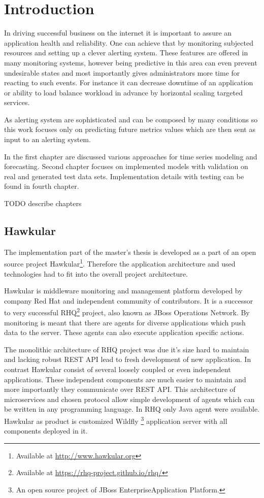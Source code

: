 
\chapter{Introduction}
In driving successful business on the internet it is important to assure an application
health and reliability. One can achieve that by monitoring subjected resources and setting
up a clever alerting system. These features are offered in many monitoring systems, however 
being predictive in this area can even prevent undesirable states and most importantly gives administrators more time for
reacting to such events. For instance it can decrease downtime of an application 
or ability to load balance workload in advance by horizontal scaling targeted services. 

As alerting system are sophisticated and can be composed by many conditions so this work
focuses only on predicting future metrics values which are then sent as input to an alerting system. 

In the first chapter are discussed various approaches for time series modeling and
forecasting. Second chapter focuses on implemented models with validation on real and 
generated test data sets. Implementation details with testing can be found in fourth chapter.

TODO describe chapters

    \section{Hawkular}
    The implementation part of the master's thesis is developed as a part of an open source project
    Hawkular\footnote{Available at \url{http://www.hawkular.org}}. 
    Therefore the application architecture and used technologies had to fit 
    into the overall project architecture.

    Hawkular is middleware monitoring and management platform
    developed by company Red Hat and independent community of contributors.
    It is a successor to very successful RHQ\footnote{Available at \url{https://rhq-project.github.io/rhq/}} 
    project, also known as JBoss Operations Network.
    By monitoring is meant that there are agents for diverse applications which
    push data to the server. These agents can also execute application specific actions. 

    The monolithic architecture of RHQ project was due it's size hard to maintain 
    and lacking robust REST API lead to fresh development of new application.   
    In contrast Hawkular consist of several loosely coupled or even independent applications.
    These independent components are much
    easier to maintain and more importantly they communicate over REST API. This
    architecture of microservices and chosen protocol allow simple development of 
    agents which can be written in any programming language. In RHQ only Java agent were
    available. Hawkular as product is customized Wildfly
    \footnote{An open source project of JBoss EnterpriseApplication Platform.}
    application server with all components deployed in it.

